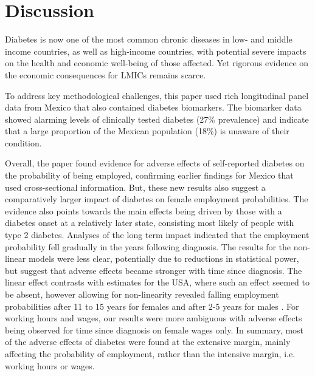 \documentclass[12pt,english]{article}
\begin{document}
\FloatBarrier
	
\section{\label{sec:cha_4_conclusion}Discussion}

Diabetes is now one of the most common chronic diseases in low- and middle income countries, as well as high-income countries, with potential severe impacts on the health and economic well-being of those affected.  Yet rigorous evidence on the economic consequences for \acp{LMIC} remains scarce.

To address key methodological challenges, this paper used rich longitudinal panel data from Mexico that also contained diabetes biomarkers. The biomarker data showed alarming levels of clinically tested diabetes (27\% prevalence) and indicate that a large proportion of the Mexican population (18\%) is unaware of their condition.

Overall, the paper found evidence for adverse effects of self-reported diabetes on the probability of being employed, confirming earlier findings for Mexico that used cross-sectional information. But, these new results also suggest a comparatively larger impact of diabetes on female employment probabilities. The evidence also points towards the main effects being driven by those with a diabetes onset at a relatively later state, consisting most likely of people with type 2 diabetes. Analyses of the long term impact indicated that the employment probability fell gradually in the years following diagnosis. The results for the non-linear models were less clear, potentially due to reductions in statistical power, but suggest that adverse effects became stronger with time since diagnosis. The linear effect contrasts with estimates for the USA, where such an effect seemed to be absent, however allowing for non-linearity revealed falling employment probabilities after 11 to 15 years for females and after 2-5 years for males \parencite{Minor2013}. For working hours and wages, our results were more ambiguous with adverse effects being observed for time since diagnosis on female wages only. In summary, most of the adverse effects of diabetes were found at the extensive margin, mainly affecting the probability of employment, rather than the intensive margin, i.e. working hours or wages. 
\end{document}
